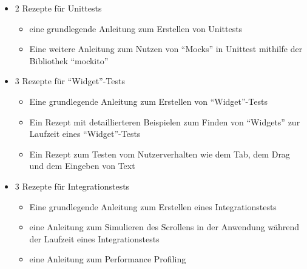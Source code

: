 \begin{itemize}[topsep=0pt,itemsep=-1ex,partopsep=1ex,parsep=1ex]
    \item 2 Rezepte für Unittests
    \begin{itemize} 
       \item eine grundlegende Anleitung zum Erstellen von Unittests 
       \item Eine weitere Anleitung zum Nutzen von \enquote{Mocks} in Unittest mithilfe der Bibliothek \enquote{mockito} 
    \end{itemize}
    \item 3 Rezepte für \enquote{Widget}-Tests
    \begin{itemize} 
        \item Eine grundlegende Anleitung zum Erstellen von \enquote{Widget}-Tests 
        \item Ein Rezept mit detaillierteren Beispielen zum Finden von \enquote{Widgets}  zur Laufzeit eines \enquote{Widget}-Tests 
        \item Ein Rezept zum Testen vom Nutzerverhalten wie dem Tab, dem Drag und dem Eingeben von Text 
     \end{itemize}
    \item 3 Rezepte für Integrationstests
    \begin{itemize} 
        \item Eine grundlegende Anleitung zum Erstellen eines Integrationstests 
        \item eine Anleitung zum Simulieren des Scrollens in der Anwendung während der Laufzeit eines Integrationstests 
        \item eine Anleitung zum Performance Profiling 
     \end{itemize}
\end{itemize}


